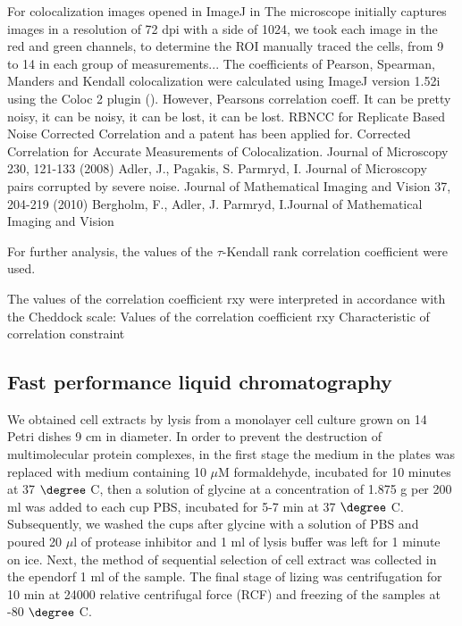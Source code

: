 \documentclass[english,authoryear]{elsarticle}
\begin{document}
For colocalization images opened in ImageJ in
The microscope initially captures images in a resolution of 72 dpi with a side of 1024, we took each image in the red and green channels, to determine the ROI manually traced the cells, from 9 to 14 in each group of measurements...
The coefficients of Pearson, Spearman, Manders and Kendall colocalization were calculated using ImageJ version 1.52i using the Coloc 2 plugin (\cite{rueden2017imagej2}).
However, Pearsons correlation coeff. It can be pretty noisy, it can be noisy, it can be lost, it can be lost. RBNCC for Replicate Based Noise Corrected Correlation and a patent has been applied for.
Corrected Correlation for Accurate Measurements of Colocalization. Journal of Microscopy 230, 121-133 (2008) Adler, J., Pagakis, S.  Parmryd, I. Journal of Microscopy pairs corrupted by severe noise.
Journal of Mathematical Imaging and Vision 37, 204-219 (2010) Bergholm, F., Adler, J.  Parmryd, I.Journal of Mathematical Imaging and Vision

For further analysis,
the values of
the $\tau$-Kendall rank correlation coefficient
 were used.

The values of the correlation coefficient rxy were interpreted in accordance with the Cheddock scale:
Values of the correlation coefficient rxy Characteristic of correlation constraint

\cite{tinevez2017trackmate}
\cite{mclean2018trajr}

\subsection{Fast performance liquid chromatography}

We obtained cell extracts by lysis from a monolayer cell culture grown on 14 Petri dishes 9 cm in diameter.
In order to prevent the destruction of multimolecular protein complexes, in the first stage the medium in the plates was replaced with medium containing 10 $\mu$M formaldehyde, incubated for 10 minutes at 37 $\degree$ C, then a solution of glycine at a concentration of 1.875 g per 200 ml was added to each cup PBS, incubated for 5-7 min at 37 $\degree$  C. Subsequently, we washed the cups after glycine with a solution of PBS and poured 20 $\mu$l of protease inhibitor and 1 ml of lysis buffer was left for 1 minute on ice.
Next, the method of sequential selection of cell extract was collected in the ependorf 1 ml of the sample. The final stage of lizing was centrifugation for 10 min at 24000 relative centrifugal force (RCF) and freezing of the samples at -80 $\degree$  C.
\end{document}
